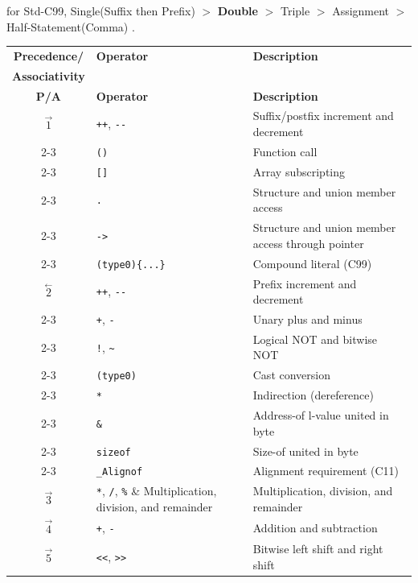 for Std-C99, Single(Suffix then Prefix) $>$ \textbf{Double} $>$ Triple $>$ Assignment $>$ Half-Statement(Comma) .

\begin{center}
\begin{longtable}{|c|l|l|}
\hline
\hline
\textbf{Precedence/} & \textbf{Operator} & \textbf{Description} \\
\textbf{Associativity} & \textbf{} & \textbf{} \\
\hline
\endfirsthead
\hline
\textbf{P/A} & \textbf{Operator} & \textbf{Description} \\
\hline
\endhead
\hline
\endfoot
\hline
\endlastfoot

$\mathop{1}\limits ^{\rightarrow}$ & \verb|++|, \verb|--| & Suffix/postfix increment and decrement \\
\cline{2-3}
 & \verb|()| & Function call \\
\cline{2-3}
 & \verb|[]| & Array subscripting \\
\cline{2-3}
 & \verb|.| & Structure and union member access \\
\cline{2-3}
 & \verb|->| & Structure and union member access through pointer \\
\cline{2-3}
 & \verb|(type0){...}| & Compound literal (C99) \\
\hline
$\mathop{2}\limits ^{\leftarrow}$ & \verb|++|, \verb|--| & Prefix increment and decrement \\
\cline{2-3}
 & \verb|+|, \verb|-| & Unary plus and minus \\
\cline{2-3}
 & \verb|!|, \verb|~| & Logical NOT and bitwise NOT \\
\cline{2-3}
 & \verb|(type0)| & Cast conversion \\
\cline{2-3}
 & \verb|*| & Indirection (dereference) \\
\cline{2-3}
 & \verb|&| & Address-of l-value united in byte \\
\cline{2-3}
 & \verb|sizeof| & Size-of united in byte \\
\cline{2-3}
 & \verb|_Alignof| & Alignment requirement (C11) \\
\hline
$\mathop{3}\limits ^{\rightarrow}$ & \verb|*|, \verb|/|, \verb|%| & Multiplication, division, and remainder \\
\hline
$\mathop{4}\limits ^{\rightarrow}$ & \verb|+|, \verb|-| & Addition and subtraction \\
\hline
$\mathop{5}\limits ^{\rightarrow}$ & \verb|<<|, \verb|>>| & Bitwise left shift and right shift \\

\end{longtable}
\end{center}
